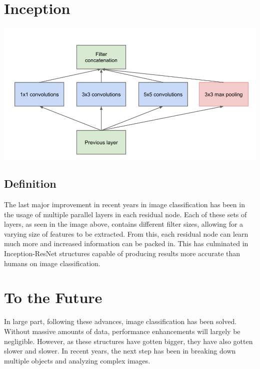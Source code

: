 \documentclass{article}
\begin{document}
\section{Inception}
\begin{center}
\includegraphics[scale=0.5]{inception}
\end{center}
\subsection{Definition}
The last major improvement in recent years in image classification has been in the usage of multiple parallel layers in each residual node. Each of these sets of layers, as seen in the image above, contains different filter sizes, allowing for a varying size of features to be extracted. From this, each residual node can learn much more and increased information can be packed in. This has culminated in Inception-ResNet structures capable of producing results more accurate than humans on image classification.

\section{To the Future}
In large part, following these advances, image classification has been solved. Without massive amounts of data, performance enhancements will largely be negligible. However, as these structures have gotten bigger, they have also gotten slower and slower. In recent years, the next step has been in breaking down multiple objects and analyzing complex images.
\end{document}
